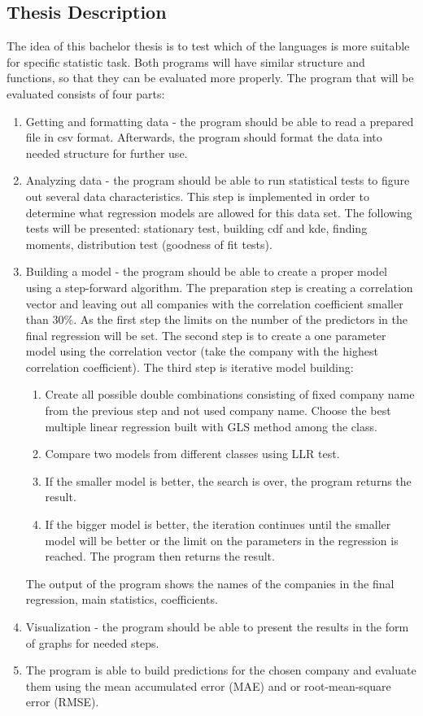 \documentclass[
  twoside,
  12pt, a4paper,
  footinclude=true,
  headinclude=true,
  cleardoublepage=empty
]{article}
\begin{document}
\subsection{Thesis Description}
The idea of this bachelor thesis is to test which of the languages is more suitable for specific statistic task. Both programs will have similar structure and functions, so that they can be evaluated more properly. The program that will be evaluated consists of four parts:
\begin{enumerate}
    \item Getting and formatting data - the program should be able to read a prepared file in csv format. Afterwards, the program should format the data into needed structure for further use.
    \item Analyzing data - the program should be able to run statistical tests to figure out several data characteristics. This step is implemented in order to determine what regression models are allowed for this data set. The following tests will be presented: stationary test, building cdf and kde, finding moments, distribution test (goodness of fit tests).
    \item Building a model - the program should be able to create a proper model using a step-forward algorithm. The preparation step is creating a correlation vector and leaving out all companies with the correlation coefficient smaller than 30\%. As the first step the limits on the number of the predictors in the final regression will be set. The second step is to create a one parameter model using the correlation vector (take the company with the highest correlation coefficient). The third step is iterative model building: 
    \begin{enumerate}
        \item Create all possible double combinations consisting of fixed company name from the previous step and not used company name. Choose the best multiple linear regression built with GLS method among the class. 
        \item Compare two models from different classes using LLR test.
        \item If the smaller model is better, the search is over, the program returns the result.
        \item If the bigger model is better, the iteration continues until the smaller model will be better or the limit on the parameters in the regression is reached. The program then returns the result. 
    \end{enumerate}
The output of the program shows the names of the companies in the final regression, main statistics, coefficients.
    \item Visualization - the program should be able to present the results in the form of graphs for needed steps.
    \item The program is able to build predictions for the chosen company and evaluate them using the mean accumulated error (MAE) and or root-mean-square error (RMSE).
\end{enumerate}
\end{document}
